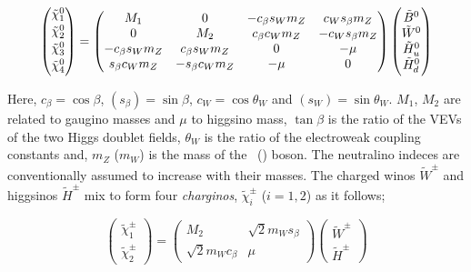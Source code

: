 				\begin{equation}
				\label{eq:neutralino_mixing}
					\begin{pmatrix}  \ninoone \\ \ninotwo \\ \ninothree \\ \ninofour \end{pmatrix}	
					= 
					\begin{pmatrix}
						M_1 & 0 & - c_\beta s_W m_Z &  c_W s_\beta m_Z  \\
						0 & M_2 & c_\beta c_W m_Z  &  - c_W s_\beta m_Z \\
						- c_\beta s_W m_Z  & c_\beta s_W m_Z  & 0 & - \mu \\ 
						s_\beta c_W m_Z  & - s_\beta c_W m_Z & - \mu & 0  
					\end{pmatrix}
					\begin{pmatrix}
						\tilde{B}^{0} \\
						\tilde{W}^{0} \\
						\tilde{H}^{0}_u \\
						\tilde{H}^{0}_d
					\end{pmatrix}
				\end{equation}

				\noindent Here, $c_{\beta} = \cos \beta$,  $(s_{\beta}) = \sin \beta$, $c_W = \cos \theta_W$ and $(s_W) = \sin \theta_W$. $M_1$, $M_2$ are related to gaugino masses and $\mu$ to higgsino mass, $\tan \beta$ is the ratio of the VEVs of the two Higgs doublet fields, $\theta_W$ is the ratio of the electroweak coupling constants and, $m_Z$ ($m_W$) is the mass of the \Zboson\ (\Wboson) boson. The neutralino indeces are conventionally assumed to increase with their masses. The charged winos $\tilde{W}^{\pm}$ and higgsinos $\tilde{H}^{\pm}$ mix to form four \textit{charginos}, $\tilde{\chi}^{\pm}_i$ ($i=1,2$) as it follows;

				\begin{equation}
				\label{eq:chargino_mixing}
						\begin{pmatrix}  \tilde{\chi}^{\pm}_1 \\ \tilde{\chi}^{\pm}_2 \end{pmatrix}	
						= 
						\begin{pmatrix}
							M_2 & \sqrt{2} m_W s_\beta \\
							\sqrt{2} m_W c_\beta & \mu  
						\end{pmatrix}
						\begin{pmatrix}
							\tilde{W}^{\pm} \\
							\tilde{H}^{\pm}
						\end{pmatrix}
				\end{equation}

